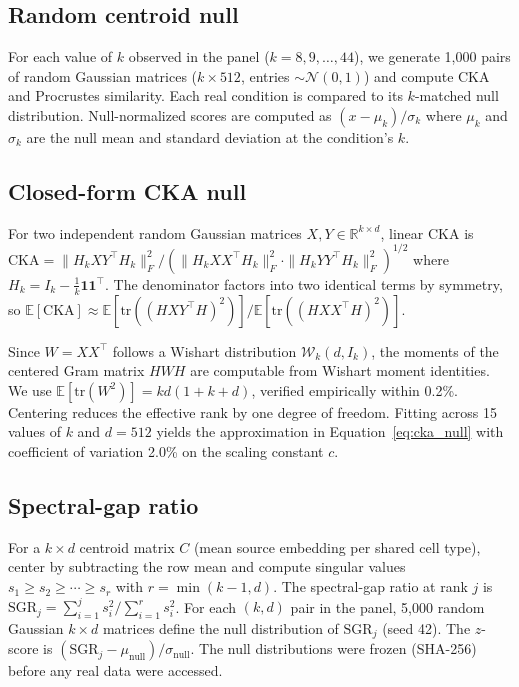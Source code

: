 \documentclass[11pt]{article}
\newcommand{\R}{\mathbb{R}}
\begin{document}
\subsection{Random centroid null}

For each value of $k$ observed in the panel ($k = 8, 9, \ldots, 44$),
we generate 1,000 pairs of random Gaussian matrices ($k \times 512$,
entries $\sim \mathcal{N}(0,1)$) and compute CKA and Procrustes
similarity. Each real condition is compared to its $k$-matched null
distribution. Null-normalized scores are computed as
$(x - \mu_k) / \sigma_k$ where $\mu_k$ and $\sigma_k$ are the null
mean and standard deviation at the condition's $k$.

\subsection{Closed-form CKA null}
\label{sec:closedform}

For two independent random Gaussian matrices $X, Y \in \R^{k \times d}$,
linear CKA is $\mathrm{CKA} = \|H_k X Y^\top H_k\|_F^2 / (\|H_k X
X^\top H_k\|_F^2 \cdot \|H_k Y Y^\top H_k\|_F^2)^{1/2}$ where
$H_k = I_k - \frac{1}{k}\mathbf{1}\mathbf{1}^\top$. The denominator
factors into two identical terms by symmetry, so
$\mathbb{E}[\mathrm{CKA}] \approx \mathbb{E}[\mathrm{tr}((HXY^\top
H)^2)] / \mathbb{E}[\mathrm{tr}((HXX^\top H)^2)]$.

Since $W = XX^\top$ follows a Wishart distribution
$\mathcal{W}_k(d, I_k)$, the moments of the centered Gram matrix $HWH$
are computable from Wishart moment identities. We use
$\mathbb{E}[\mathrm{tr}(W^2)] = kd(1 + k + d)$, verified empirically
within 0.2\%. Centering reduces the effective rank by one degree of
freedom. Fitting across 15 values of $k$ and $d = 512$ yields the
approximation in Equation~\ref{eq:cka_null} with coefficient of
variation 2.0\% on the scaling constant $c$.

\subsection{Spectral-gap ratio}
\label{sec:sgrmethod}

For a $k \times d$ centroid matrix $C$ (mean source embedding per
shared cell type), center by subtracting the row mean and compute
singular values $s_1 \geq s_2 \geq \cdots \geq s_r$ with $r =
\min(k{-}1, d)$. The spectral-gap ratio at rank $j$ is $\mathrm{SGR}_j
= \sum_{i=1}^j s_i^2 / \sum_{i=1}^r s_i^2$. For each $(k, d)$ pair in
the panel, 5,000 random Gaussian $k \times d$ matrices define the null
distribution of $\mathrm{SGR}_j$ (seed 42). The $z$-score is
$({\mathrm{SGR}_j - \mu_{\mathrm{null}}}) / {\sigma_{\mathrm{null}}}$.
The null distributions were frozen (SHA-256) before any real data were
accessed.
\end{document}
